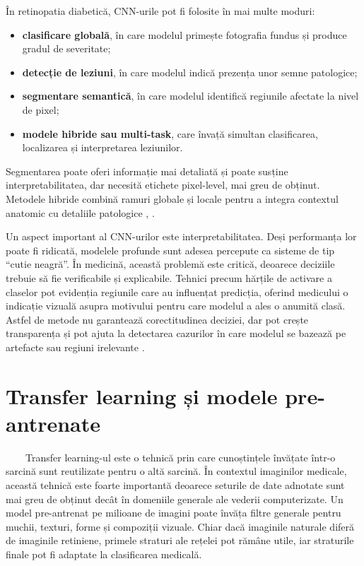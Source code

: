 \documentclass[12pt, a4paper, oneside, romanian]{teza-upb}
\begin{document}
În retinopatia diabetică, CNN-urile pot fi folosite în mai multe moduri:

\begin{itemize}
  \item \textbf{clasificare globală}, în care modelul primește fotografia fundus și produce gradul de severitate;
  \item \textbf{detecție de leziuni}, în care modelul indică prezența unor semne patologice;
  \item \textbf{segmentare semantică}, în care modelul identifică regiunile afectate la nivel de pixel;
  \item \textbf{modele hibride sau multi-task}, care învață simultan clasificarea, localizarea și interpretarea leziunilor.
\end{itemize}

Segmentarea poate oferi informație mai detaliată și poate susține interpretabilitatea, dar necesită etichete pixel-level, mai greu de obținut. Metodele hibride combină ramuri globale și locale pentru a integra contextul anatomic cu detaliile patologice \cite{6_wang2021deep}, \cite{11_shakibania2024dual}.
\bigskip

Un aspect important al CNN-urilor este interpretabilitatea. Deși performanța lor poate fi ridicată, modelele profunde sunt adesea percepute ca sisteme de tip ``cutie neagră''. În medicină, această problemă este critică, deoarece deciziile trebuie să fie verificabile și explicabile. Tehnici precum hărțile de activare a claselor pot evidenția regiunile care au influențat predicția, oferind medicului o indicație vizuală asupra motivului pentru care modelul a ales o anumită clasă. Astfel de metode nu garantează corectitudinea deciziei, dar pot crește transparența și pot ajuta la detectarea cazurilor în care modelul se bazează pe artefacte sau regiuni irelevante \cite{9_chetoui2020explainable}.

\section{Transfer learning și modele pre-antrenate}

\ \ \ \ Transfer learning-ul este o tehnică prin care cunoștințele învățate într-o sarcină sunt reutilizate pentru o altă sarcină. În contextul imaginilor medicale, această tehnică este foarte importantă deoarece seturile de date adnotate sunt mai greu de obținut decât în domeniile generale ale vederii computerizate. Un model pre-antrenat pe milioane de imagini poate învăța filtre generale pentru muchii, texturi, forme și compoziții vizuale. Chiar dacă imaginile naturale diferă de imaginile retiniene, primele straturi ale rețelei pot rămâne utile, iar straturile finale pot fi adaptate la clasificarea medicală.
\bigskip
\end{document}
